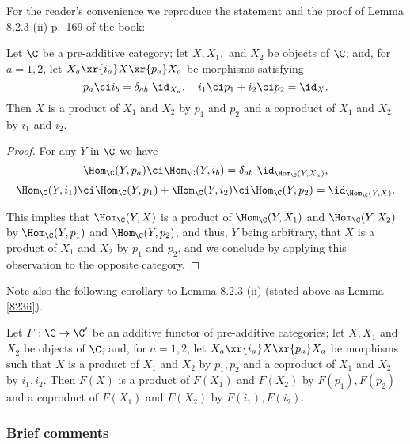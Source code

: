 \documentclass[12pt]{article}
\theoremstyle{remark}
\theoremstyle{definition}
\begin{document}
For the reader's convenience we reproduce the statement and the proof of Lemma 8.2.3 (ii) p.~169 of the book:

\begin{lem}[Lemma 8.2.3 (ii) p. 169]
Let $\C$ be a pre-additive category; let $X,X_1,$ and $X_2$ be objects of $\C$; and, for $a=1,2$, let $X_a\xr{i_a}X\xr{p_a}X_a$ be morphisms satisfying 
$$
p_a\ci i_b=\delta_{ab}\ \id_{X_a},\quad i_1\ci p_1+i_2\ci p_2=\id_X.
$$
Then $X$ is a product of $X_1$ and $X_2$ by $p_1$ and $p_2$ and a coproduct of $X_1$ and $X_2$ by $i_1$ and $i_2$. 
\end{lem}

\begin{proof}
For any $Y$ in $\C$ we have 
$$
\Hom_\C(Y,p_a)\ci\Hom_\C(Y,i_b)=\delta_{ab}\ \id_{\Hom_\C(Y,X_a)},
$$ 
$$
\Hom_\C(Y,i_1)\ci\Hom_\C(Y,p_1)+\Hom_\C(Y,i_2)\ci\Hom_\C(Y,p_2)=\id_{\Hom_\C(Y,X)}.
$$ 

\nn This implies that $\Hom_\C(Y,X)$ is a product of $\Hom_\C(Y,X_1)$ and $\Hom_\C(Y,X_2)$ by $\Hom_\C(Y,p_1)$ and $\Hom_\C(Y,p_2)$, and thus, $Y$ being arbitrary, that $X$ is a product of $X_1$ and $X_2$ by $p_1$ and $p_2$, and we conclude by applying this observation to the opposite category.
\end{proof}

Note also the following corollary to Lemma 8.2.3 (ii) (stated above as Lemma \ref{823ii}). 

\begin{cor}
Let $F:\C\to\C'$ be an additive functor of pre-additive categories; let $X,X_1$ and $X_2$ be objects of $\C$; and, for $a=1,2$, let $X_a\xr{i_a}X\xr{p_a}X_a$ be morphisms such that $X$ is a product of $X_1$ and $X_2$ by $p_1,p_2$ and a coproduct of $X_1$ and $X_2$ by $i_1,i_2$. Then $F(X)$ is a product of $F(X_1)$ and $F(X_2)$ by $F(p_1),F(p_2)$ and a coproduct of $F(X_1)$ and $F(X_2)$ by $F(i_1),F(i_2)$. 
\end{cor}


\subsubsection{Brief comments}
\end{document}
